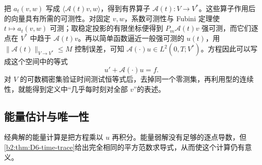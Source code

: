 \ProseParagraphBreak

把 \(a_t(v,w)\) 写成 \(\langle\mathcal A(t)v,w\rangle\)，得到有界算子 \(\mathcal A(t):V\to V^*\)。这些算子作用后的向量具有所需的可测性。对固定 \(v,w\)，系数可测性与 Fubini 定理使 \(t\mapsto a_t(v,w)\) 可测；取稳定投影的有限坐标便得到 \(P_m\mathcal A(t)v\) 强可测，而它们逐点在 \(V^*\) 中趋于 \(\mathcal A(t)v\)。再以简单函数逼近一般强可测的 \(u(t)\)，用 \(\|\mathcal A(t)\|_{V\to V^*}\leq M\) 控制误差，可知 \(\mathcal A(\cdot)u\in L^2(0,T;V^*)\)。方程因此可以写成这个空间中的等式
\[
 u'+\mathcal A(\cdot)u=f.
\]
对 \(V\) 的可数稠密集验证时间测试恒等式后，去掉同一个零测集，再利用型的连续性，就能得到定义中“几乎每时刻对全部 \(v\)”的表述。

\subsection{能量估计与唯一性}
\label{b2:subsec:D20603}

经典解的能量计算是把方程乘以 \(u\) 再积分。能量弱解没有足够的逐点导数，但\cref{b2:thm:D6-time-trace}给出完全相同的平方范数求导式，从而使这个计算仍有意义。

